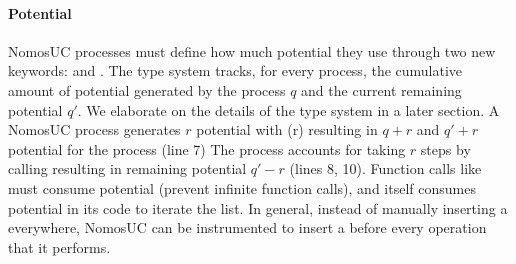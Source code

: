 \paragraph{Potential}
NomosUC processes must define how much potential they use through two new keywords: \inline{$\ngenpot$} and \inline{$\ntick$}.
The type system tracks, for every process, the cumulative amount of potential generated by the process $q$ and the current remaining potential $q'$. We elaborate on the details of the type system in a later section.
A NomosUC process generates $r$ potential with \inline{$\ngenpot$}(r) resulting in $q+r$ and $q'+r$ potential for the process (line 7)
The process accounts for taking $r$ steps by calling  resulting in remaining potential $q'-r$ (lines 8, 10).
Function calls like  must consume potential (prevent infinite function calls), and  itself consumes potential in its code to iterate the list.
In general, instead of manually inserting a \itick everywhere, NomosUC can be instrumented to insert a \itick before every operation that it performs.


